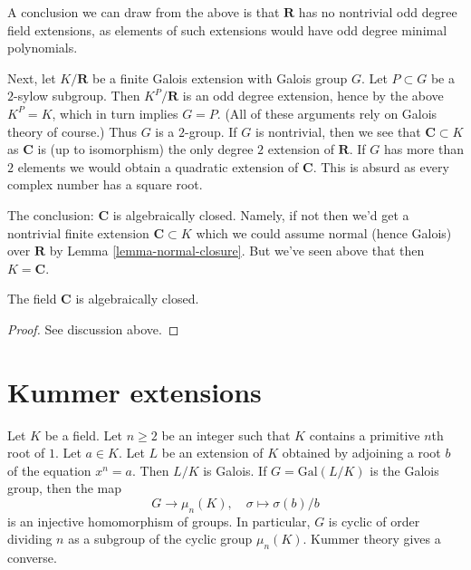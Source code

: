 \medskip\noindent
A conclusion we can draw from the above is that $\mathbf{R}$ has
no nontrivial odd degree field extensions, as elements of such extensions
would have odd degree minimal polynomials.

\medskip\noindent
Next, let $K/\mathbf{R}$ be a finite Galois extension with Galois group $G$.
Let $P \subset G$ be a $2$-sylow subgroup. Then $K^P/\mathbf{R}$ is an
odd degree extension, hence by the above $K^P = K$, which in turn implies
$G = P$. (All of these arguments rely on Galois theory of course.)
Thus $G$ is a $2$-group. If $G$ is nontrivial, then we see that
$\mathbf{C} \subset K$ as $\mathbf{C}$ is (up to isomorphism) the only
degree $2$ extension of $\mathbf{R}$. If $G$ has more than $2$ elements
we would obtain a quadratic extension of $\mathbf{C}$.
This is absurd as every complex number has a square root.

\medskip\noindent
The conclusion: $\mathbf{C}$ is algebraically closed. Namely, if not
then we'd get a nontrivial finite extension $\mathbf{C} \subset K$
which we could assume normal (hence Galois) over $\mathbf{R}$ by
Lemma \ref{lemma-normal-closure}. But we've seen above that then
$K = \mathbf{C}$.

\begin{lemma}
\label{lemma-C-algebraically-closed}
The field $\mathbf{C}$ is algebraically closed.
\end{lemma}

\begin{proof}
See discussion above.
\end{proof}





\section{Kummer extensions}
\label{section-Kummer}

\noindent
Let $K$ be a field. Let $n \geq 2$ be an integer such that $K$ contains
a primitive $n$th root of $1$. Let $a \in K$. Let $L$ be an extension
of $K$ obtained by adjoining a root $b$ of the equation $x^n = a$.
Then $L/K$ is Galois. If $G = \text{Gal}(L/K)$ is the Galois group, then
the map
$$
G \longrightarrow \mu_n(K),\quad \sigma \longmapsto \sigma(b)/b
$$
is an injective homomorphism of groups. In particular, $G$ is cyclic
of order dividing $n$ as a subgroup of the cyclic group $\mu_n(K)$.
Kummer theory gives a converse.


